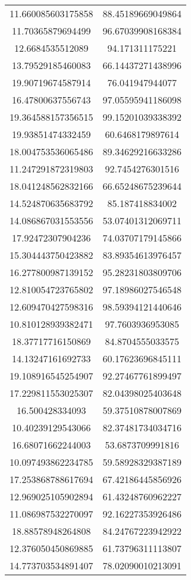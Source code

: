 \begin{table}
\begin{tabular}{cc}
11.660085603175858 & 88.45189669049864 \\
11.70365879694499 & 96.67039908168384 \\
12.6684535512089 & 94.171311175221 \\
13.79529185460083 & 66.14437271438996 \\
19.90719674587914 & 76.041947944077 \\
16.47800637556743 & 97.05595941186098 \\
19.364588157356515 & 99.15201039338392 \\
19.93851474332459 & 60.6468179897614 \\
18.004753536065486 & 89.34629216633286 \\
11.247291872319803 & 92.7454276301516 \\
18.041248562832166 & 66.65248675239644 \\
14.524870635683792 & 85.187418834002 \\
14.086867031553556 & 53.07401312069711 \\
17.92472307904236 & 74.03707179145866 \\
15.304443750423882 & 83.89354613976457 \\
16.277800987139152 & 95.28231803809706 \\
12.810054723765802 & 97.18986027546548 \\
12.609470427598316 & 98.59394121440646 \\
10.810128939382471 & 97.7603936953085 \\
18.37717716150869 & 84.8704555033575 \\
14.13247161692733 & 60.17623696845111 \\
19.108916545254907 & 92.27467761899497 \\
17.229811553025307 & 82.04398025403648 \\
16.500428334093 & 59.37510878007869 \\
10.40239129543066 & 82.37481734034716 \\
16.68071662244003 & 53.6873709991816 \\
10.097493862234785 & 59.58928329387189 \\
17.253868788617694 & 67.42186445856926 \\
12.969025105902894 & 61.43248760962227 \\
11.086987532270097 & 92.16227353926486 \\
18.88578948264808 & 84.24767223942922 \\
12.376050450869885 & 61.73796311113807 \\
14.773703534891407 & 78.02090010213091 \\

\end{tabular}
\end{table}
